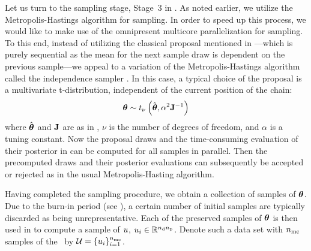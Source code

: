 Let us turn to the sampling stage, Stage~3 in . As noted earlier, we utilize the Metropolis-Hastings algorithm for sampling. In order to speed up this process, we would like to make use of the omnipresent multicore parallelization for sampling. To this end, instead of utilizing the classical proposal mentioned in ---which is purely sequential as the mean for the next sample draw is dependent on the previous sample---we appeal to a variation of the Metropolis-Hastings algorithm called the independence sampler \cite{gelman2004}. In this case, a typical choice of the proposal is a multivariate t-distribution, independent of the current position of the chain:
\begin{equation} \elabel{proposal}
  \vparam \sim \studentst{\nu}{\hat{\vparam}}{\alpha^2 \mOI^{-1}}
\end{equation}
where $\hat{{\boldsymbol\theta}}$ and $\mathbf{J}$ are as in , $\nu$ is the number of degrees of freedom, and $\alpha$ is a tuning constant. Now the proposal draws and the time-consuming evaluation of their posterior in  can be computed for all samples in parallel.
Then the precomputed draws and their posterior evaluations can subsequently be accepted or rejected as in the usual Metropolis-Hasting algorithm.

Having completed the sampling procedure, we obtain a collection of samples of ${\boldsymbol\theta}$. Due to the burn-in period (see ), a certain number of initial samples are typically discarded as being unrepresentative.
Each of the preserved samples of ${\boldsymbol\theta}$ is then used in  to compute a sample of $u$, $u_i \in \mathbb{R}^{{n_\text{d}} {n_\text{p}}}$.
Denote such a data set with ${n_\text{mc}}$ samples of the \qoi\ by $\mathcal{U} = \{ u_i \}_{i = 1}^{n_\text{mc}}$.
